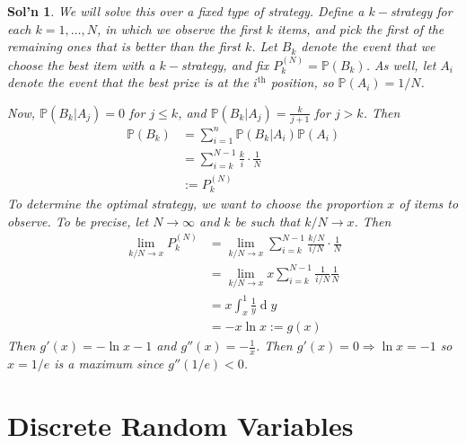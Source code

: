 \documentclass[12pt, a4paper]{book}
\renewcommand{\Pr}{\mathbb{P}}
\renewcommand{\d}[1]{\ensuremath{\operatorname{d}\!{#1}}} %
\theoremstyle{nonumberplain}
\newtheorem{solution}{Sol'n}
\begin{document}
\begin{solution}
    We will solve this over a fixed type of strategy.
    Define a $k-$strategy for each $k=1,\ldots,N$, in which we observe the first $k$ items, and pick the first of the remaining ones that is better than the first $k$.
    Let $B_k$ denote the event that we choose the best item with a $k-$strategy, and fix $P_k^{(N)}=\Pr(B_k)$.
    As well, let $A_i$ denote the event that the best prize is at the $i^\text{th}$ position, so $\Pr(A_i)=1/N$.

    Now, $\Pr(B_k|A_j)=0$ for $j\leq k$, and $\Pr(B_k|A_j)=\frac{k}{j+1}$ for $j>k$.
    Then
    \begin{align*}
        \Pr(B_k) &= \sum\limits_{i=1}^n\Pr(B_k|A_i)\Pr(A_i)\\
                 &= \sum\limits_{i=k}^{N-1}\frac{k}{i}\cdot\frac{1}{N}\\
                 &:= P_k^{(N)}
    \end{align*}
    To determine the optimal strategy, we want to choose the proportion $x$ of items to observe.
    To be precise, let $N\to\infty$ and $k$ be such that $k/N\to x$.
    Then
    \begin{align*}
        \lim_{k/N\to x}P_k^{(N)} &= \lim_{k/N\to x}\sum\limits_{i=k}^{N-1}\frac{k/N}{i/N}\cdot\frac{1}{N}\\
            &= \lim_{k/N\to x}x\sum\limits_{i=k}^{N-1}\frac{1}{i/N}\frac{1}{N}\\
            &= x\int_x^1\frac{1}{y}\d{y}\\
            &= -x\ln x := g(x)
    \end{align*}
    Then $g'(x)=-\ln x-1$ and $g''(x)=-\frac{1}{x}$.
    Then $g'(x)=0\Rightarrow \ln x=-1$ so $x=1/e$ is a maximum since $g''(1/e)<0$.
    \begin{center}
    \end{center}
\end{solution}
\chapter{Discrete Random Variables}
\end{document}
